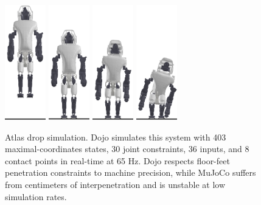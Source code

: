 \begin{figure}[H]
	\centering
	\includegraphics[height=5.0cm]{dojo/atlas1.png} 
	\includegraphics[height=5.0cm]{dojo/atlas2.png}
	\includegraphics[height=5.0cm]{dojo/atlas3.png}
	\includegraphics[height=5.0cm]{dojo/atlas4.png}
	\caption[Atlas drop test simulation]{Atlas drop simulation. Dojo simulates this system with 403 maximal-coordinates states, 30 joint constraints, 36 inputs, and 8 contact points in real-time at 65 Hz. Dojo respects floor-feet penetration constraints to machine precision, while MuJoCo suffers from centimeters of interpenetration and is unstable at low simulation rates.}
	\label{dojo_atlas_drop}
\end{figure}

